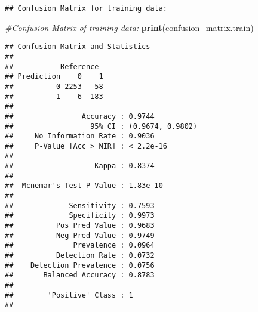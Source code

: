 \documentclass[
]{article}
\newenvironment{Shaded}{\begin{snugshade}}{\end{snugshade}}
\newcommand{\AttributeTok}[1]{\textcolor[rgb]{0.13,0.29,0.53}{#1}}
\newcommand{\CommentTok}[1]{\textcolor[rgb]{0.56,0.35,0.01}{\textit{#1}}}
\newcommand{\DecValTok}[1]{\textcolor[rgb]{0.00,0.00,0.81}{#1}}
\newcommand{\FunctionTok}[1]{\textcolor[rgb]{0.13,0.29,0.53}{\textbf{#1}}}
\newcommand{\NormalTok}[1]{#1}
\newcommand{\OtherTok}[1]{\textcolor[rgb]{0.56,0.35,0.01}{#1}}
\newcommand{\SpecialCharTok}[1]{\textcolor[rgb]{0.81,0.36,0.00}{\textbf{#1}}}
\newcommand{\StringTok}[1]{\textcolor[rgb]{0.31,0.60,0.02}{#1}}
\begin{document}
\begin{Shaded}
\end{Shaded}

\begin{verbatim}
## Confusion Matrix for training data:
\end{verbatim}

\begin{Shaded}
\begin{Highlighting}[]
\CommentTok{\#Confusion Matrix of training data:}
\FunctionTok{print}\NormalTok{(confusion\_matrix.train)}
\end{Highlighting}
\end{Shaded}

\begin{verbatim}
## Confusion Matrix and Statistics
## 
##           Reference
## Prediction    0    1
##          0 2253   58
##          1    6  183
##                                           
##                Accuracy : 0.9744          
##                  95% CI : (0.9674, 0.9802)
##     No Information Rate : 0.9036          
##     P-Value [Acc > NIR] : < 2.2e-16       
##                                           
##                   Kappa : 0.8374          
##                                           
##  Mcnemar's Test P-Value : 1.83e-10        
##                                           
##             Sensitivity : 0.7593          
##             Specificity : 0.9973          
##          Pos Pred Value : 0.9683          
##          Neg Pred Value : 0.9749          
##              Prevalence : 0.0964          
##          Detection Rate : 0.0732          
##    Detection Prevalence : 0.0756          
##       Balanced Accuracy : 0.8783          
##                                           
##        'Positive' Class : 1               
## 
\end{verbatim}
\end{document}
